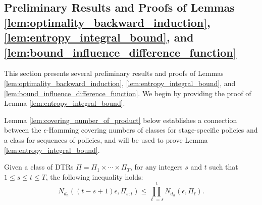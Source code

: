 \setcounter{equation}{0}
\renewcommand{\theequation}{B.\arabic{equation}}

\subsection{Preliminary Results and Proofs of Lemmas \ref{lem:optimality_backward_induction}, \ref{lem:entropy_integral_bound}, and \ref{lem:bound_influence_difference_function}}\label{app:preliminary_results}

This section presents several preliminary results and proofs of Lemmas \ref{lem:optimality_backward_induction}, \ref{lem:entropy_integral_bound}, and \ref{lem:bound_influence_difference_function}.
We begin by providing the proof of Lemma \ref{lem:entropy_integral_bound}.

Lemma \ref{lem:covering_number_of_product} below establishes a connection between the $\epsilon$-Hamming covering numbers of classes for stage-specific policies and a class for sequences of policies, and will be used to prove Lemma \ref{lem:entropy_integral_bound}.

\medskip

\begin{lemma}\label{lem:covering_number_of_product}
Given a class of DTRs $\Pi=\Pi_1 \times \cdots \times \Pi_T$, for any integers $s$ and $t$ such that $1\leq s \leq t \leq T$, the following inequality holds: $$N_{d_h}((t-s + 1)\epsilon,\Pi_{s:t}) \leq \prod_{\ell=s}^{t}N_{d_h}(\epsilon,\Pi_{\ell}).$$
\end{lemma}

